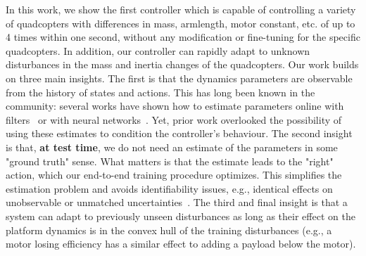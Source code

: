 %
%
In this work, we show the first controller which is capable of controlling a variety of quadcopters with differences in mass, armlength, motor constant, etc. of up to 4 times within one second, without any modification or fine-tuning for the specific quadcopters. 
%
In addition, our controller can rapidly adapt to unknown disturbances in the mass and inertia changes of the quadcopters.
%
Our work builds on three main insights.
%
The first is that the dynamics parameters are observable from the history of states and actions.
%
This has long been known in the community: several works have shown how to estimate parameters online with filters~\cite{svacha2020imu,wuest2019online} or with neural networks~\cite{forgione2021continuous}.
%
Yet, prior work overlooked the possibility of using these estimates to condition the controller's behaviour.
%
The second insight is that, \textbf{at test time}, we do not need an estimate of the parameters in some "ground truth" sense.
%
What matters is that the estimate leads to the "right" action, which our end-to-end training procedure optimizes.
%
This simplifies the estimation problem and avoids identifiability issues, e.g., identical effects on unobservable or unmatched uncertainties~\cite{hovakimyan2010l1}.
%
%
%
The third and final insight is that a system can adapt to previously unseen disturbances as long as their effect on the platform dynamics is in the convex hull of the training disturbances (e.g., a motor losing efficiency has a similar effect to adding a payload below the motor).

